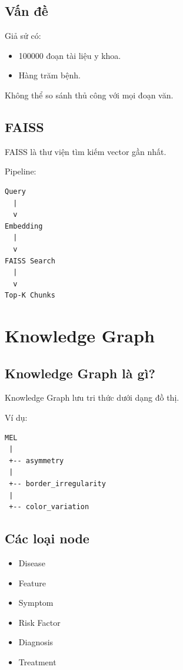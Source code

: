 \documentclass[12pt,a4paper]{article}
\begin{document}
\subsection{Vấn đề}

Giả sử có:

\begin{itemize}
\item 100000 đoạn tài liệu y khoa.
\item Hàng trăm bệnh.
\end{itemize}

Không thể so sánh thủ công với mọi đoạn văn.

\subsection{FAISS}

FAISS là thư viện tìm kiếm vector gần nhất.

Pipeline:

\begin{verbatim}
Query
  |
  v
Embedding
  |
  v
FAISS Search
  |
  v
Top-K Chunks
\end{verbatim}

\section{Knowledge Graph}

\subsection{Knowledge Graph là gì?}

Knowledge Graph lưu tri thức dưới dạng đồ thị.

Ví dụ:

\begin{verbatim}
MEL
 |
 +-- asymmetry
 |
 +-- border_irregularity
 |
 +-- color_variation
\end{verbatim}

\subsection{Các loại node}

\begin{itemize}
\item Disease
\item Feature
\item Symptom
\item Risk Factor
\item Diagnosis
\item Treatment
\end{itemize}
\end{document}
